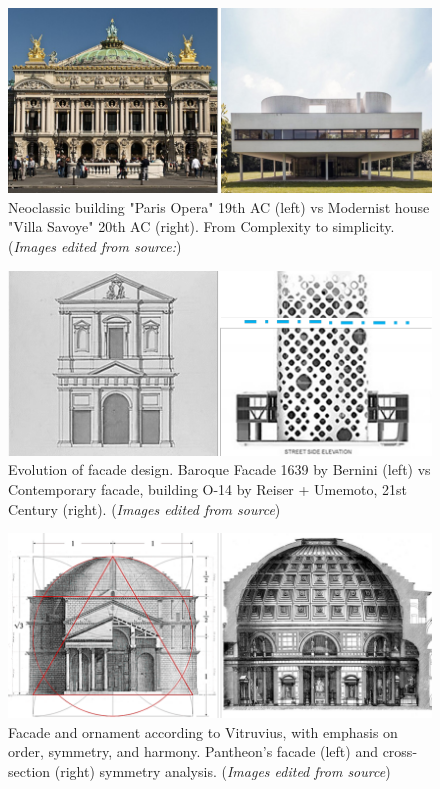      \begin{figure}[htb]
          \centering
          \includegraphics[width= \linewidth]{Images/NeoclassicismVsModernism}
          \caption{Neoclassic building "Paris Opera" 19th AC (left) vs Modernist house "Villa Savoye" 20th AC (right). From Complexity to simplicity. (\textit{Images edited from source:\cite{Stacbond2020}})}
          \label{fig:NeoclassicalvsModernism}
        \end{figure}

    \begin{figure}[htb]
        \centering
        \includegraphics[width= \linewidth]{Images/BaroqueVsContemporaryfacade}
        \caption{Evolution of facade design.
        Baroque Facade 1639 by Bernini (left) vs Contemporary facade, building O-14 by Reiser + Umemoto, 21st Century (right). (\textit{Images edited from source})}
        \label{fig:FacadeBaroqueVsContemporary}
    \end{figure}

    \begin{figure}[htb]
    \centering
    \includegraphics[width= \linewidth]{Images/VitruvianArchitecture}
    \caption{Facade and ornament according to Vitruvius, with emphasis on order, symmetry, and harmony. Pantheon's facade (left) and cross-section (right) symmetry analysis. (\textit{Images edited from source})}
    \label{fig:Vitruvianarchitecture}
    \end{figure}


